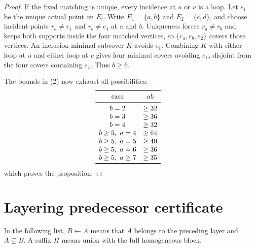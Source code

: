 \documentclass[a4paper,fleqn,longmktitle]{cas-sc}
\theoremstyle{definition}
\theoremstyle{remark}
\begin{document}
\begin{proof}
If the fixed matching is unique, every incidence at $u$ or $v$ is a loop.
Let $e_i$ be the unique actual point on $E_i$.  Write $E_1=\{a,b\}$ and
$E_2=\{c,d\}$, and choose incident points
$r_a\neq e_1$ and $r_b\neq e_1$ at $a$ and $b$.  Uniqueness forces
$r_a\neq r_b$ and keeps both supports inside the four matched vertices, so
$\{r_a,r_b,e_2\}$ covers those vertices.  An inclusion-minimal subcover
$K$ avoids $e_1$.  Combining $K$ with either loop at $u$ and either loop at
$v$ gives four minimal covers avoiding $e_1$, disjoint from the four covers
containing $e_1$.  Thus $b\geq6$.

The bounds in (2) now exhaust all possibilities:
\[
\begin{array}{cc}
\toprule
\text{case}&ab\\
\midrule
b=2&\geq32\\
b=3&\geq36\\
b=4&\geq32\\
b\geq5,\ a=4&\geq64\\
b\geq5,\ a=5&\geq40\\
b\geq5,\ a=6&\geq36\\
b\geq5,\ a\geq7&\geq35\\
\bottomrule
\end{array}
\]
which proves the proposition.
\end{proof}

\section{Layering predecessor certificate}
\label{app:layering}

In the following list, $B\leftarrow A$ means that $A$ belongs to the preceding
layer and $A\subsetneq B$.  A suffix $H$ means union with the full homogeneous
block.
\end{document}
